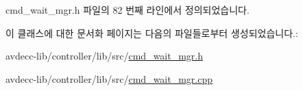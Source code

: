 cmd\+\_\+wait\+\_\+mgr.\+h 파일의 82 번째 라인에서 정의되었습니다.



이 클래스에 대한 문서화 페이지는 다음의 파일들로부터 생성되었습니다.\+:\begin{DoxyCompactItemize}
\item 
avdecc-\/lib/controller/lib/src/\hyperlink{cmd__wait__mgr_8h}{cmd\+\_\+wait\+\_\+mgr.\+h}\item 
avdecc-\/lib/controller/lib/src/\hyperlink{cmd__wait__mgr_8cpp}{cmd\+\_\+wait\+\_\+mgr.\+cpp}\end{DoxyCompactItemize}
